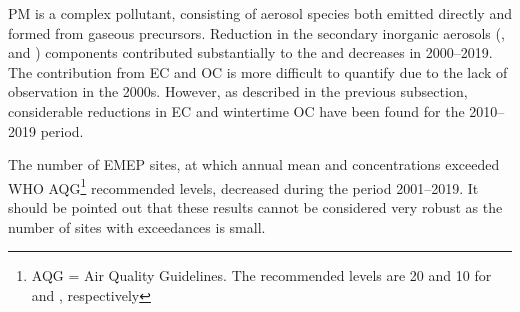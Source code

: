 PM is a complex pollutant, consisting of aerosol species both emitted directly and formed from gaseous precursors. 
Reduction in the secondary inorganic aerosols (\soiv, \noiii and \nhiv) components contributed substantially to the \PM[10] and \PM[2.5] decreases in 2000--2019. The contribution from EC and OC is more difficult to quantify due to the lack of observation in the 2000s. However, as described in the previous subsection, considerable reductions in EC and wintertime OC have been found for the 2010--2019 period.  


The number of EMEP sites, at which annual mean \PM[10] and \PM[2.5] concentrations exceeded WHO AQG\footnote{AQG = Air Quality Guidelines. The recommended levels are 20 and 10 \ug for \PM[10] and \PM[2.5], respectively } recommended levels, decreased during the period 2001--2019. It should be pointed out that these results cannot be considered very robust as the number of sites with exceedances is small. 




